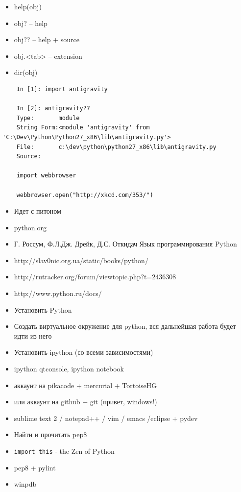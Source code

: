 \documentclass{article}
\begin{document}
\newpage

\begin{itemize}
    \item help(obj)
    \item obj?    -- help
    \item obj??   -- help + source
    \item obj.<tab>  -- extension
    \item dir(obj)
\end{itemize}

\begin{lstlisting}
    In [1]: import antigravity

    In [2]: antigravity??
    Type:       module
    String Form:<module 'antigravity' from 'C:\Dev\Python\Python27_x86\lib\antigravity.py'>
    File:       c:\dev\python\python27_x86\lib\antigravity.py
    Source:

    import webbrowser

    webbrowser.open("http://xkcd.com/353/")
\end{lstlisting}
\newpage

\begin{itemize}
    \item Идет с питоном
    \item python.org
    \item Г. Россум, Ф.Л.Дж. Дрейк, Д.С. Откидач Язык программирования Python
    \item http://slav0nic.org.ua/static/books/python/
    \item http://rutracker.org/forum/viewtopic.php?t=2436308
    \item http://www.python.ru/docs/
\end{itemize}
\newpage

\begin{itemize}
    \item Установить Python
    \item Создать виртуальное окружение для python, 
            вся дальнейшая работа будет идти из него
    \item Установить ipython (со всеми зависимостями)
    \item ipython qtconsole, ipython notebook
    \item аккаунт на pikacode + mercurial + TortoiseHG
    \item или аккаунт на github + git (привет, windows!)
    \item sublime text 2 / notepad++ / vim / emacs /eclipse + pydev
    \item Найти и прочитать pep8
    \item \lstinline!import this! - the Zen of Python
    \item pep8 + pylint
    \item winpdb
\end{itemize}
\newpage

\end{document}
